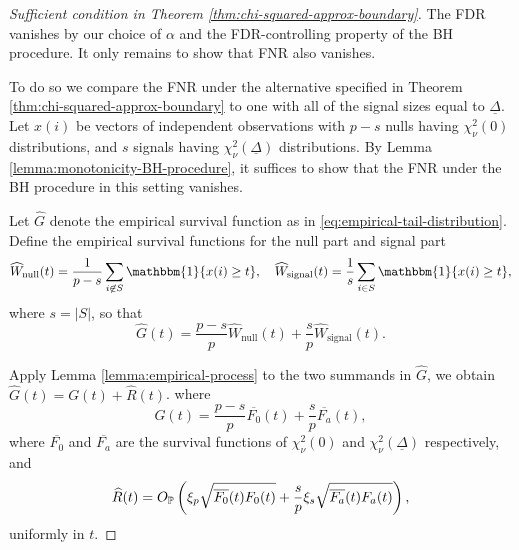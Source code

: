 \begin{proof}[Sufficient condition in Theorem \ref{thm:chi-squared-approx-boundary}]
The FDR vanishes by our choice of $\alpha$ and the FDR-controlling property of the BH procedure.
It only remains to show that FNR also vanishes.

To do so we compare the FNR under the alternative specified in Theorem \ref{thm:chi-squared-approx-boundary} to one with all of the signal sizes equal to $\underline{\Delta}$.
Let $x(i)$ be vectors of independent observations with $p-s$ nulls having $\chi^2_\nu(0)$ distributions, and $s$ signals having $\chi^2_\nu(\underline{\Delta})$ distributions.
By Lemma \ref{lemma:monotonicity-BH-procedure}, it suffices to show that the FNR under the BH procedure in this setting vanishes.

Let $\widehat{G}$ denote the empirical survival function as in \eqref{eq:empirical-tail-distribution}.
Define the empirical survival functions for the null part and signal part
\begin{equation} \label{eq:empirical-survival-null-signal}
    \widehat{W}_\text{null}(t) = \frac{1}{p-s}\sum_{i\not\in S}\mathbbm{1}\{x(i) \ge t\},
    \quad
    \widehat{W}_\text{signal}(t) = \frac{1}{s}\sum_{i\in S}\mathbbm{1}\{x(i) \ge t\},
\end{equation}
where $s=|S|$, so that
$$
\widehat{G}(t) = \frac{p-s}{p}\widehat{W}_\text{null}(t) + \frac{s}{p}\widehat{W}_\text{signal}(t).
$$


Apply Lemma \ref{lemma:empirical-process} to the two summands in $\widehat{G}$, we obtain
$\widehat{G}(t) = G(t) + \widehat{R}(t)$.
where 
\begin{equation} \label{eq:empirical-process-mean}
    G(t) = \frac{p-s}{p}\overline{F_0}(t) + \frac{s}{p}\overline{F_a}(t),
\end{equation}
where $\overline{F_0}$ and $\overline{F_{a}}$ are the survival functions of $\chi_\nu^2(0)$ and $\chi_\nu^2(\underline{\Delta})$ respectively, and 
\begin{equation} \label{eq:empirical-process-residual}
    \widehat{R}(t) = O_\P\left(\xi_p\sqrt{\overline{F_0}(t)F_0(t)} + \frac{s}{p}\xi_s\sqrt{\overline{F_a}(t)F_a(t)}\right),
\end{equation}
uniformly in $t$.


\end{proof}
